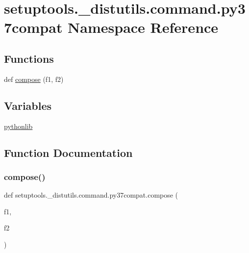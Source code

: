 \hypertarget{namespacesetuptools_1_1__distutils_1_1command_1_1py37compat}{}\section{setuptools.\+\_\+distutils.\+command.\+py37compat Namespace Reference}
\label{namespacesetuptools_1_1__distutils_1_1command_1_1py37compat}
\subsection*{Functions}
\begin{DoxyCompactItemize}
\item 
def \hyperlink{namespacesetuptools_1_1__distutils_1_1command_1_1py37compat_aad6ad718100ebda7c4be82d5d55538fe}{compose} (f1, f2)
\end{DoxyCompactItemize}
\subsection*{Variables}
\begin{DoxyCompactItemize}
\item 
\hyperlink{namespacesetuptools_1_1__distutils_1_1command_1_1py37compat_a55a176dfd874652d6ab951b33815b02d}{pythonlib}
\end{DoxyCompactItemize}


\subsection{Function Documentation}
\mbox{\label{namespacesetuptools_1_1__distutils_1_1command_1_1py37compat_aad6ad718100ebda7c4be82d5d55538fe}} 
\subsubsection{\texorpdfstring{compose()}{compose()}}
{\footnotesize\ttfamily def setuptools.\+\_\+distutils.\+command.\+py37compat.\+compose (\begin{DoxyParamCaption}\item[{}]{f1,  }\item[{}]{f2 }\end{DoxyParamCaption})}



